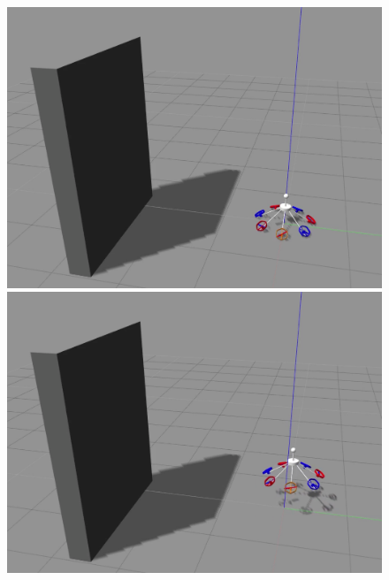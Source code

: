 \begin{figure}[!ht]
    \begin{center}
    \begin{minipage}[t]{0.495\textwidth}
      \includegraphics[width=\linewidth]{images/Selection_009.png}
    \end{minipage}
    \hfill
    \begin{minipage}[t]{0.495\textwidth}
      \includegraphics[width=\linewidth]{images/Selection_010.png}
    \end{minipage}
    \hfill
    \begin{minipage}[t]{0.495\textwidth}

\end{minipage}
\end{center}
\end{figure}
